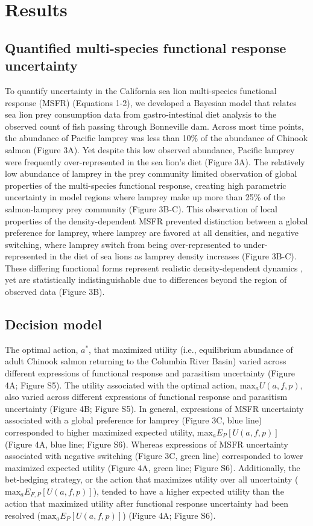 \documentclass{article}
\begin{document}
\section*{Results}

\subsection*{Quantified multi-species functional response uncertainty}

To quantify uncertainty in the California sea lion multi-species functional response (MSFR) (Equations 1-2), we developed a Bayesian model that relates sea lion prey consumption data from gastro-intestinal diet analysis to the observed count of fish passing through Bonneville dam. Across most time points, the abundance of Pacific lamprey was less than 10\% of the abundance of Chinook salmon (Figure 3A). Yet despite this low observed abundance, Pacific lamprey were frequently over-represented in the sea lion's diet (Figure 3A). The relatively low abundance of lamprey in the prey community limited observation of global properties of the multi-species functional response, creating high parametric uncertainty in model regions where lamprey make up more than 25\% of the salmon-lamprey prey community (Figure 3B-C). This observation of local properties of the density-dependent MSFR prevented distinction between a global preference for lamprey, where lamprey are favored at all densities, and negative switching, where lamprey switch from being over-represented to under-represented in the diet of sea lions as lamprey density increases (Figure 3B-C). These differing functional forms represent realistic density-dependent dynamics \parencite{hellstrom2014functional, rindorf2006prey}, yet are statistically indistinguishable due to differences beyond the region of observed data (Figure 3B).

\subsection*{Decision model}

The optimal action, $a^*$, that maximized utility (i.e., equilibrium abundance of adult Chinook salmon returning to the Columbia River Basin) varied across different expressions of functional response and parasitism uncertainty (Figure 4A; Figure S5). The utility associated with the optimal action, $\text{max}_aU(a,f,p)$, also varied across different expressions of functional response and parasitism uncertainty (Figure 4B; Figure S5). In general, expressions of MSFR uncertainty associated with a global preference for lamprey (Figure 3C, blue line) corresponded to higher maximized expected utility, $\text{max}_aE_P[U(a,f,p)]$ (Figure 4A, blue line; Figure S6). Whereas expressions of MSFR uncertainty associated with negative switching (Figure 3C, green line) corresponded to lower maximized expected utility (Figure 4A, green line; Figure S6). Additionally, the bet-hedging strategy, or the action that maximizes utility over all uncertainty ($\text{max}_aE_{F,P}[U(a,f,p)]$), tended to have a higher expected utility than the action that maximized utility after functional response uncertainty had been resolved ($\text{max}_aE_{P}[U(a,f,p)]$) (Figure 4A; Figure S6).
\end{document}
